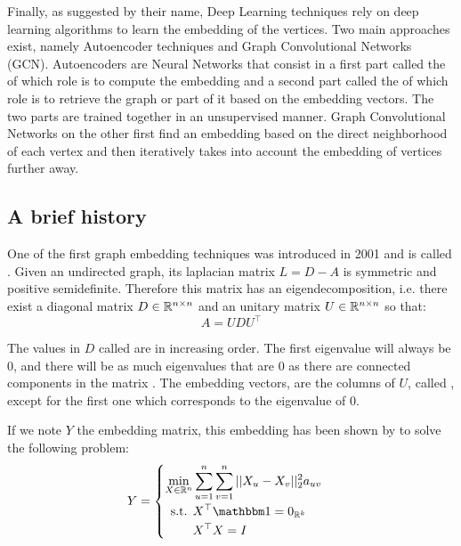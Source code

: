 Finally, as suggested by their name, Deep Learning techniques rely on deep learning algorithms to learn the embedding of the vertices. Two main approaches exist, namely Autoencoder techniques and Graph Convolutional Networks (GCN). Autoencoders are Neural Networks that consist in a first part called the  of which role is to compute the embedding and a second part called the  of which role is to retrieve the graph or part of it based on the embedding vectors. The two parts are trained together in an unsupervised manner. Graph Convolutional Networks on the other first find an embedding based on the direct neighborhood of each vertex and then iteratively takes into account the embedding of vertices further away.

\subsection{A brief history}\label{subsec:embedding_history}
One of the first graph embedding techniques was introduced in 2001 and is called  \cite{belkin2001_spectralEmbedding}. Given an undirected graph, its laplacian matrix $ L = D - A$ is symmetric and positive semidefinite. Therefore this matrix has an eigendecomposition, i.e. there exist a diagonal matrix $D \in \mathbb{R}^{n\times n}$ and an unitary matrix $U \in \mathbb{R}^{n \times n}$ so that:
\begin{equation}
    A = U D U^\top
\end{equation}

The values in $D$ called  are in increasing order. The first eigenvalue will always be $0$, and there will be as much eigenvalues that are $0$ as there are connected components in the matrix \cite{belkin2001_spectralEmbedding}. The embedding vectors, are the columns of $U$, called , except for the first one which corresponds to the eigenvalue of 0.

If we note $Y$ the embedding matrix, this embedding has been shown by \cite{belkin2001_spectralEmbedding} to solve the following problem:
\begin{equation}
    Y = \begin{cases}
    \begin{aligned}
        \min_{X \in \realset^n} &\sum_{u = 1}^n\sum_{v=1}^n ||X_u - X_v||_2^2a_{uv}\\
        \text{s.t.  } & X^\top \ones = \zeros{\realset^k}\\
                    & X^\top X = I
    \end{aligned}
    \end{cases}
\end{equation}

